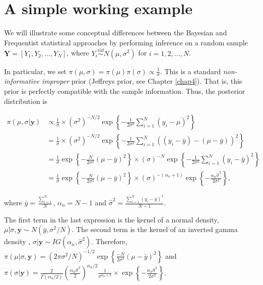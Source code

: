 \section{A simple working example}\label{sec26}

We will illustrate some conceptual differences between the Bayesian and Frequentist statistical approaches by performing inference on a random sample $\mathbf{Y} = [Y_1, Y_2, \dots, Y_N]$, where $Y_i \stackrel{iid}{\sim} N(\mu, \sigma^2)$ for $i = 1, 2, \dots, N$.

In particular, we set $\pi(\mu, \sigma) = \pi(\mu) \pi(\sigma) \propto \frac{1}{\sigma}$. This is a standard \textit{non-informative improper} prior (Jeffreys prior, see Chapter \ref{chap4}). That is, this prior is perfectly compatible with the sample information. Thus, the posterior distribution is

\begin{align*}
	\pi(\mu,\sigma|\mathbf{y})&\propto \frac{1}{\sigma}\times (\sigma^2)^{-N/2}\exp\left\{-\frac{1}{2\sigma^2}\sum_{i=1}^N (y_i-\mu)^2\right\}\\
	&= \frac{1}{\sigma}\times (\sigma^2)^{-N/2}\exp\left\{-\frac{1}{2\sigma^2}\sum_{i=1}^N ((y_i-\bar{y}) - (\mu-\bar{y}))^2\right\}\\
	&=  \frac{1}{\sigma}\exp\left\{-\frac{N}{2\sigma^2}(\mu-\bar{y})^2\right\}\times (\sigma)^{-N}\exp\left\{-\frac{1}{2\sigma^2}\sum_{i=1}^N (y_i-\bar{y})^2\right\}\\
	&=  \frac{1}{\sigma}\exp\left\{-\frac{N}{2\sigma^2}(\mu-\bar{y})^2\right\}\times (\sigma)^{-(\alpha_n+1)}\exp\left\{-\frac{\alpha_n\hat{\sigma}^2}{2\sigma^2}\right\},	
\end{align*}

where $\bar{y}=\frac{\sum_{i=1}^N}{N}$, $\alpha_n=N-1$ and $\hat{\sigma}^2=\frac{\sum_{i=1}^N (y_i-\bar{y})^2}{N-1}$.

The first term in the last expression is the kernel of a normal density, $\mu|\sigma,\mathbf{y}\sim N(\bar{y},\sigma^2/N)$. The second term is the kernel of an inverted gamma density \cite[p.~371]{zellner1996introduction}, $\sigma|\mathbf{y}\sim IG(\alpha_n,\hat{\sigma}^2)$. Therefore, $\pi(\mu|\sigma,\mathbf{y})=(2\pi\sigma^2/N)^{-1/2}\exp\left\{\frac{-N}{2\sigma^2}(\mu-\bar{y})^2\right\}$ and $\pi(\sigma|\mathbf{y})=\frac{2}{\Gamma(\alpha_n/2)}\left(\frac{\alpha_n\hat{\sigma}^2}{2}\right)^{\alpha_n/2}\frac{1}{\sigma^{\alpha_n+1}}\times\exp\left\{-\frac{\alpha_n\hat{\sigma}^2}{2\sigma^2}\right\}$.

